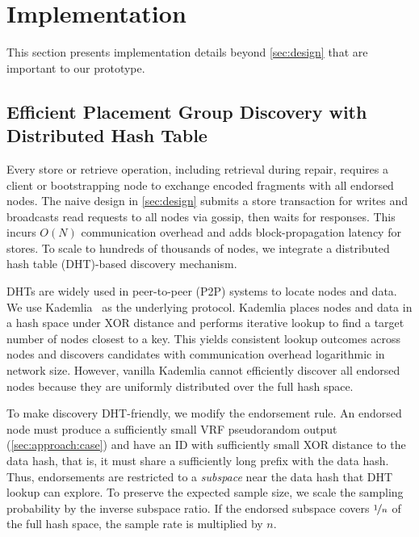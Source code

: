 \section{Implementation}
\label{sec:impl}

This section presents implementation details beyond \cref{sec:design} that are important to our \sys prototype.

\subsection{Efficient Placement Group Discovery with Distributed Hash Table}
\label{sec:impl:dht}

Every store or retrieve operation, including retrieval during repair, requires a client or bootstrapping node to exchange encoded fragments with all endorsed nodes.
The naive design in \cref{sec:design} submits a store transaction for writes and broadcasts read requests to all nodes via gossip, then waits for responses.
This incurs $O(N)$ communication overhead and adds block-propagation latency for stores.
To scale to hundreds of thousands of nodes, we integrate a distributed hash table (DHT)-based discovery mechanism.

DHTs are widely used in peer-to-peer (P2P) systems to locate nodes and data.
We use Kademlia~\cite{kademlia} as the underlying protocol.
Kademlia places nodes and data in a hash space under XOR distance and performs iterative lookup to find a target number of nodes closest to a key.
This yields consistent lookup outcomes across nodes and discovers candidates with communication overhead logarithmic in network size.
 
However, vanilla Kademlia cannot efficiently discover all endorsed nodes because they are uniformly distributed over the full hash space.

To make discovery DHT-friendly, we modify the endorsement rule.
An endorsed node must produce a sufficiently small VRF pseudorandom output (\cref{sec:approach:case}) and have an ID with sufficiently small XOR distance to the data hash, that is, it must share a sufficiently long prefix with the data hash.
Thus, endorsements are restricted to a \emph{subspace} near the data hash that DHT lookup can explore.
To preserve the expected sample size, we scale the sampling probability by the inverse subspace ratio.
If the endorsed subspace covers $\nicefrac{1}{n}$ of the full hash space, the sample rate is multiplied by $n$.
 

